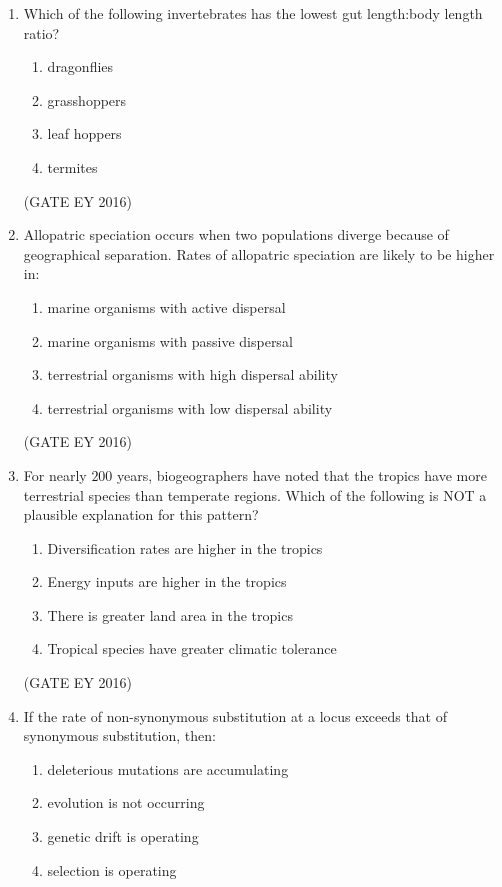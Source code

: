 \documentclass[journal]{IEEEtran}
\begin{document}
\begin{enumerate}[label=Q.\arabic*.]
\item Which of the following invertebrates has the lowest gut length:body length ratio?
\begin{multicols}{4}
\begin{enumerate}
    \item dragonflies
    \item grasshoppers
    \item leaf hoppers
    \item termites
\end{enumerate}
\end{multicols}
\hfill{(GATE EY 2016)}

\item Allopatric speciation occurs when two populations diverge because of geographical separation. Rates of allopatric speciation are likely to be higher in:
\begin{enumerate}
    \item marine organisms with active dispersal
    \item marine organisms with passive dispersal
    \item terrestrial organisms with high dispersal ability
    \item terrestrial organisms with low dispersal ability
\end{enumerate}
\hfill{(GATE EY 2016)}

\item For nearly $200$ years, biogeographers have noted that the tropics have more terrestrial species than temperate regions. Which of the following is NOT a plausible explanation for this pattern?
\begin{enumerate}
    \item Diversification rates are higher in the tropics
    \item Energy inputs are higher in the tropics
    \item There is greater land area in the tropics
    \item Tropical species have greater climatic tolerance
\end{enumerate}
\hfill{(GATE EY 2016)}

\item If the rate of non-synonymous substitution at a locus exceeds that of synonymous substitution, then:
\begin{enumerate}
    \item deleterious mutations are accumulating
    \item evolution is not occurring
    \item genetic drift is operating
    \item selection is operating
\end{enumerate}


\end{enumerate}
\end{document}
